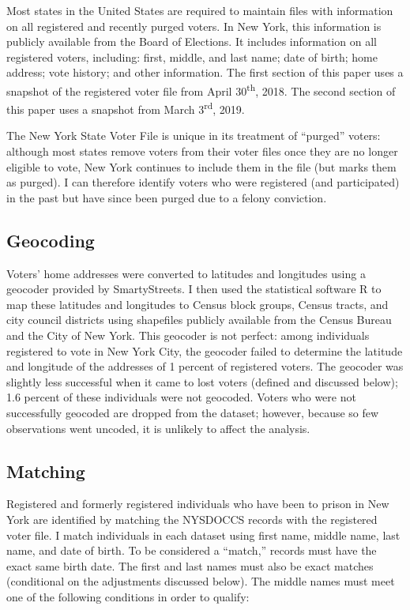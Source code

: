 \documentclass[12pt,]{article}
\begin{document}
Most states in the United States are required to maintain files with information on all registered and recently purged voters. In New York, this information is publicly available from the Board of Elections. It includes information on all registered voters, including: first, middle, and last name; date of birth; home address; vote history; and other information. The first section of this paper uses a snapshot of the registered voter file from April 30\textsuperscript{th}, 2018. The second section of this paper uses a snapshot from March 3\textsuperscript{rd}, 2019.

The New York State Voter File is unique in its treatment of ``purged'' voters: although most states remove voters from their voter files once they are no longer eligible to vote, New York continues to include them in the file (but marks them as purged). I can therefore identify voters who were registered (and participated) in the past but have since been purged due to a felony conviction.

\hypertarget{geocoding}{%
\subsection*{Geocoding}\label{geocoding}}

Voters' home addresses were converted to latitudes and longitudes using a geocoder provided by SmartyStreets. I then used the statistical software R to map these latitudes and longitudes to Census block groups, Census tracts, and city council districts using shapefiles publicly available from the Census Bureau and the City of New York. This geocoder is not perfect: among individuals registered to vote in New York City, the geocoder failed to determine the latitude and longitude of the addresses of 1 percent of registered voters. The geocoder was slightly less successful when it came to lost voters (defined and discussed below); 1.6 percent of these individuals were not geocoded. Voters who were not successfully geocoded are dropped from the dataset; however, because so few observations went uncoded, it is unlikely to affect the analysis.

\hypertarget{matching}{%
\subsection*{Matching}\label{matching}}

Registered and formerly registered individuals who have been to prison in New York are identified by matching the NYSDOCCS records with the registered voter file. I match individuals in each dataset using first name, middle name, last name, and date of birth. To be considered a ``match,'' records must have the exact same birth date. The first and last names must also be exact matches (conditional on the adjustments discussed below). The middle names must meet one of the following conditions in order to qualify:
\end{document}
